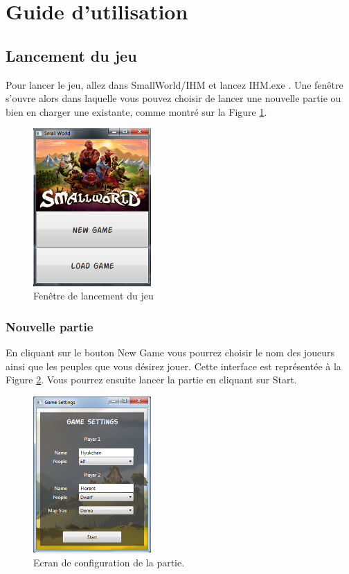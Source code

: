 \documentclass[a4paper]{article}
\begin{document}
\section{Guide d'utilisation}
	\subsection{Lancement du jeu}
	Pour lancer le jeu, allez dans SmallWorld/IHM et lancez \og IHM.exe \fg{}. Une fenêtre s'ouvre alors dans laquelle vous pouvez choisir de lancer une nouvelle partie ou bien en charger une existante, comme montré sur la Figure \ref{fig:lancement}.
	\begin{figure}[h!]
		\centering
		\includegraphics[width=0.4\textwidth]{../../IHM/lancement.png}
		\caption{Fenêtre de lancement du jeu}
		\label{fig:lancement}		
	\end{figure}

		\subsubsection{Nouvelle partie}
		En cliquant sur le bouton \og New Game\fg{} vous pourrez choisir le nom des joueurs ainsi que les peuples que vous désirez jouer. Cette interface est représentée à la Figure \ref{fig:settings}.
		Vous pourrez ensuite lancer la partie en cliquant sur \og Start\fg{}.
		\begin{figure}[h!]
			\centering
			\includegraphics[width=0.4\textwidth]{../../IHM/settings.png}
			\caption{Ecran de configuration de la partie.}
			\label{fig:settings}
		\end{figure}
\end{document}
